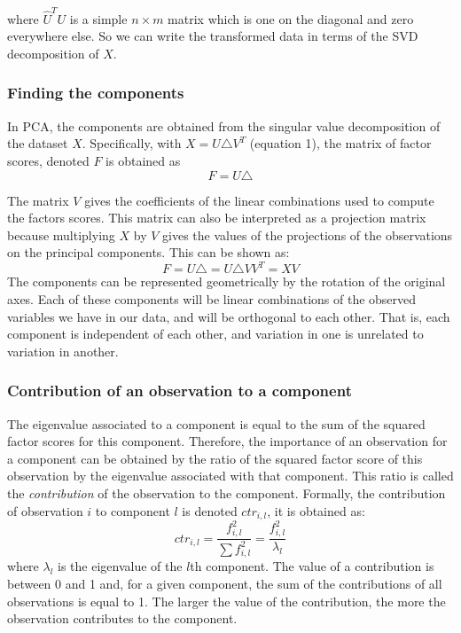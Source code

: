 \documentclass[12pt,twoside]{article}
\begin{document}
where $\hat{U}^{T}U$ is a simple $n \times m$ matrix which is one on the diagonal and zero everywhere else. So we can write the transformed data in terms of the SVD decomposition of $X$. 


\subsubsection{Finding the components}

In PCA, the components are obtained from the singular value decomposition of the dataset $X$. Specifically, with $X = U\triangle V^{T}$ (equation 1), the matrix of factor scores, denoted $F$ is obtained as
\begin{equation}
F = U\triangle
\end{equation}

The matrix $V$ gives the coefficients of the linear combinations used to compute the factors scores. This matrix can also be interpreted as a projection matrix because multiplying $X$ by $V$ gives the values of the projections of the observations on the principal components. This can be shown as:
\begin{equation}
F = U\triangle = U\triangle VV^{T}  = XV
\end{equation}
\bigbreak
The components can be represented geometrically by the rotation of the original axes. Each of these components will be linear combinations of the observed variables we have in our data, and will be orthogonal to each other. That is, each component is independent of each other, and variation in one is unrelated to variation in another. 

\subsubsection{Contribution of an observation to a component}

The eigenvalue associated to a component is equal to the sum of the squared factor scores for this component. Therefore, the importance of an observation for a component can be obtained by the ratio of the squared factor score of this observation by the eigenvalue associated with that component. This ratio is called the \textit{contribution} of the observation to the component. Formally, the contribution of observation $i$ to component $l$ is denoted $ ctr_{i,l}$, it is obtained as:
\begin{equation}
ctr_{i,l} = \frac{f^2_{i,l} }{\sum f^2_{i,l}} = \frac{f^2_{i,l} }{\lambda_{l}}
\end{equation}
where $\lambda_{l}$ is the eigenvalue of the $l$th component. The value of a contribution is between 0 and 1 and, for a given component, the sum of the contributions of all observations is equal to 1. The larger the value of the contribution, the more the observation contributes to the component. 
\end{document}
